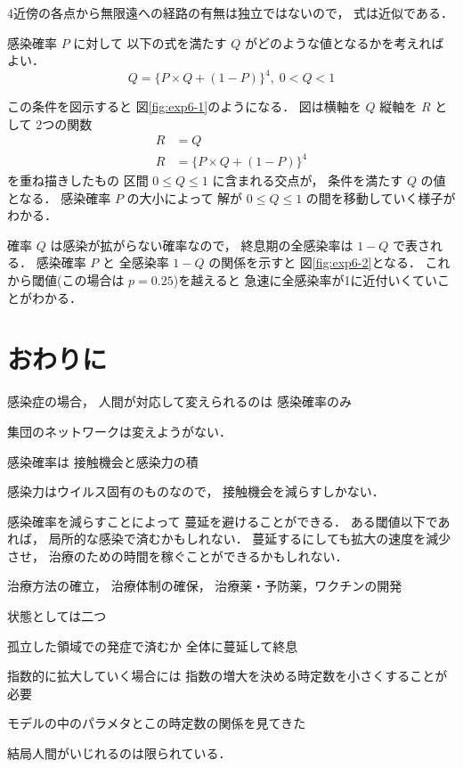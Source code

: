 \documentclass[10pt,oneside]{scrartcl}
\begin{document}
4近傍の各点から無限遠への経路の有無は独立ではないので，
式は近似である．


感染確率 \(P\) に対して
以下の式を満たす \(Q\) がどのような値となるかを考えればよい．
\begin{equation}
  Q=\{P\times Q + (1-P)\}^{4},\;0<Q<1
\end{equation}

\begin{figure}%
  \centering
  \myGraph*{}
\end{figure}

この条件を図示すると
図\ref{fig:exp6-1}のようになる．
図は横軸を \(Q\)
縦軸を \(R\) として
2つの関数
\begin{align}
  R&=Q\\
  R&=\{P\times Q + (1-P)\}^{4}
\end{align}
を重ね描きしたもの
区間 \(0\le Q\le 1\) に含まれる交点が，
条件を満たす \(Q\) の値となる．
感染確率 \(P\) の大小によって
解が \(0\le Q\le 1\) の間を移動していく様子がわかる．

\begin{figure}%
  \centering
  \myGraph*{}
\end{figure}

確率 \(Q\) は感染が拡がらない確率なので，
終息期の全感染率は \(1-Q\) で表される．
感染確率 \(P\) と 
全感染率 \(1-Q\) の関係を示すと
図\ref{fig:exp6-2}となる．
これから閾値(この場合は \(p=0.25\))を越えると
急速に全感染率が1に近付いくていことがわかる．

\section{おわりに}
\label{sec:orgb10bcee}

感染症の場合，
人間が対応して変えられるのは
感染確率のみ

集団のネットワークは変えようがない．

感染確率は
接触機会と感染力の積

感染力はウイルス固有のものなので，
接触機会を減らすしかない．

感染確率を減らすことによって
蔓延を避けることができる．
ある閾値以下であれば，
局所的な感染で済むかもしれない．
蔓延するにしても拡大の速度を減少させ，
治療のための時間を稼ぐことができるかもしれない．

治療方法の確立，
治療体制の確保，
治療薬・予防薬，ワクチンの開発

状態としては二つ

孤立した領域での発症で済むか
全体に蔓延して終息

指数的に拡大していく場合には
指数の増大を決める時定数を小さくすることが必要

モデルの中のパラメタとこの時定数の関係を見てきた

結局人間がいじれるのは限られている．
\end{document}

